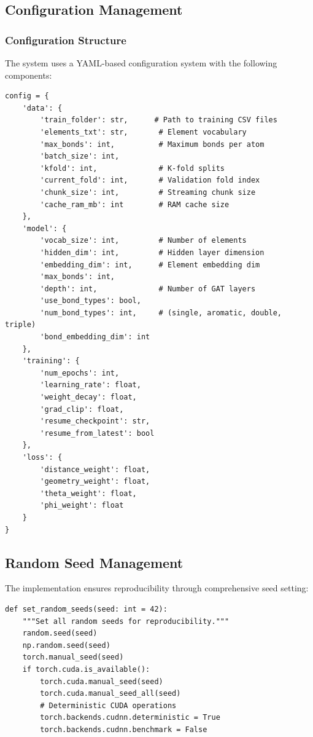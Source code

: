 \documentclass[11pt,a4paper]{article}
\begin{document}
\subsection{Configuration Management}

\subsubsection{Configuration Structure}
The system uses a YAML-based configuration system with the following components:

\begin{lstlisting}[caption={Configuration Schema}]
config = {
    'data': {
        'train_folder': str,      # Path to training CSV files
        'elements_txt': str,       # Element vocabulary
        'max_bonds': int,          # Maximum bonds per atom
        'batch_size': int,
        'kfold': int,              # K-fold splits
        'current_fold': int,       # Validation fold index
        'chunk_size': int,         # Streaming chunk size
        'cache_ram_mb': int        # RAM cache size
    },
    'model': {
        'vocab_size': int,         # Number of elements
        'hidden_dim': int,         # Hidden layer dimension
        'embedding_dim': int,      # Element embedding dim
        'max_bonds': int,
        'depth': int,              # Number of GAT layers
        'use_bond_types': bool,
        'num_bond_types': int,     # (single, aromatic, double, triple)
        'bond_embedding_dim': int
    },
    'training': {
        'num_epochs': int,
        'learning_rate': float,
        'weight_decay': float,
        'grad_clip': float,
        'resume_checkpoint': str,
        'resume_from_latest': bool
    },
    'loss': {
        'distance_weight': float,
        'geometry_weight': float,
        'theta_weight': float,
        'phi_weight': float
    }
}
\end{lstlisting}

\subsection{Random Seed Management}

The implementation ensures reproducibility through comprehensive seed setting:

\begin{lstlisting}[caption={Random Seed Initialization (lines 60-77)}]
def set_random_seeds(seed: int = 42):
    """Set all random seeds for reproducibility."""
    random.seed(seed)
    np.random.seed(seed)
    torch.manual_seed(seed)
    if torch.cuda.is_available():
        torch.cuda.manual_seed(seed)
        torch.cuda.manual_seed_all(seed)
        # Deterministic CUDA operations
        torch.backends.cudnn.deterministic = True
        torch.backends.cudnn.benchmark = False
\end{lstlisting}
\end{document}
